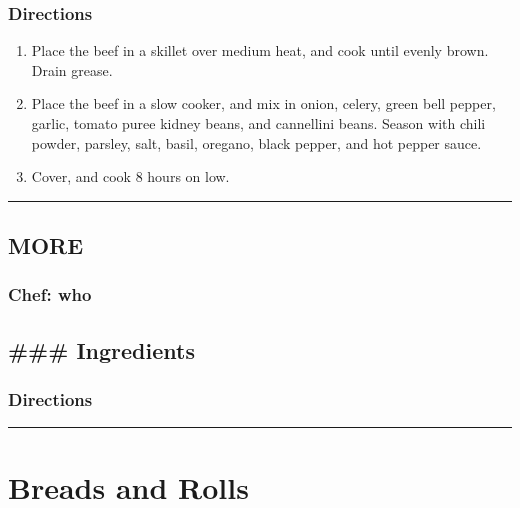 \documentclass[
]{book}
\providecommand{\tightlist}{%
  \setlength{\itemsep}{0pt}\setlength{\parskip}{0pt}}
\begin{document}
\hypertarget{directions-73}{%
\subsection*{Directions}\label{directions-73}}


\begin{enumerate}
\def\labelenumi{\arabic{enumi})}
\tightlist
\item
  Place the beef in a skillet over medium heat, and cook until evenly brown. Drain grease.
\item
  Place the beef in a slow cooker, and mix in onion, celery, green bell pepper, garlic,
  tomato puree kidney beans, and cannellini beans. Season with chili powder, parsley,
  salt, basil, oregano, black pepper, and hot pepper sauce.
\item
  Cover, and cook 8 hours on low.
\end{enumerate}

\begin{center}\rule{0.5\linewidth}{0.5pt}\end{center}

\hypertarget{more-2}{%
\section*{MORE}\label{more-2}}


\hypertarget{chef-who-2}{%
\subsection*{Chef: who}\label{chef-who-2}}


\hypertarget{ingredients-74}{%
\section*{\#\#\# Ingredients}\label{ingredients-74}}


\hypertarget{directions-74}{%
\subsection*{Directions}\label{directions-74}}


\begin{center}\rule{0.5\linewidth}{0.5pt}\end{center}

\hypertarget{Breads}{%
\chapter{Breads and Rolls}\label{Breads}}
\end{document}
